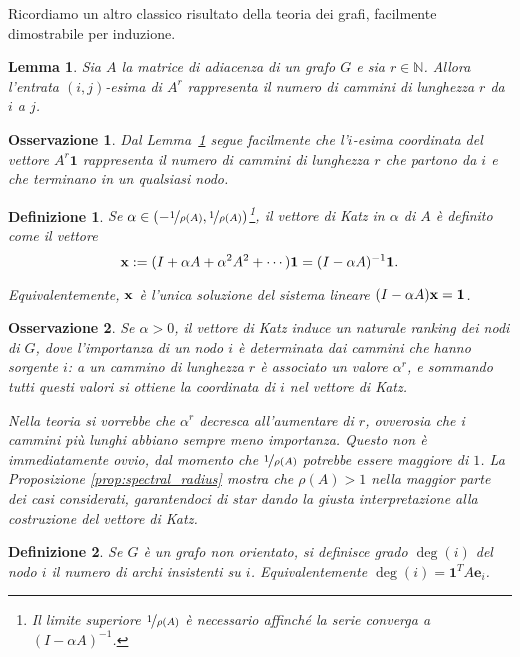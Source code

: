 \documentclass[a4paper]{article}
\newcommand{\NN}{\mathbb{N}}
\newcommand{\xvec}{{\bf x}}
\newcommand{\bone}{\mathbf{1}}
\newcommand{\inv}{^{-1}}
\newtheorem{lemma}{Lemma}
\newtheorem{definition}{Definizione}
\newtheorem{remark}{Osservazione}
\begin{document}
Ricordiamo un altro classico risultato della teoria dei grafi, facilmente
dimostrabile per induzione.

\begin{lemma}
    \label{lemma:numero_cammini}
    Sia $A$ la matrice di adiacenza di un grafo $G$ e sia $r \in \NN$. Allora l'entrata $(i,j)$-esima di $A^r$ rappresenta il numero di cammini
    di lunghezza $r$ da $i$ a $j$.
\end{lemma}

\begin{remark}
    \label{remark:molt_per_1}
    Dal Lemma~\ref{lemma:numero_cammini} segue facilmente che l'$i$-esima
    coordinata del vettore $A^r \bone$ rappresenta il numero di cammini
    di lunghezza $r$ che partono da $i$ e che terminano in un qualsiasi nodo.
\end{remark}

\begin{definition} Se $\alpha \in (-\nicefrac{1}{\rho(A)}, \nicefrac{1}{\rho(A)})$\footnote{Il limite superiore $\nicefrac{1}{\rho(A)}$ è necessario affinché la serie converga a $(I-\alpha A)\inv$.}, {\rm il vettore di Katz in $\alpha$ di $A$} è definito come il vettore
\[
    \xvec := (I + \alpha A + \alpha^2A^2+\cdots) \bone = (I-\alpha A)\inv \bone.
\]

Equivalentemente, $\xvec$ è l'unica soluzione del sistema lineare $(I-\alpha A)\xvec = \bone$.
\end{definition}

\begin{remark}
    Se $\alpha > 0$, il vettore di Katz induce un naturale ranking dei nodi di $G$, dove l'importanza
    di un nodo $i$ è determinata dai cammini che hanno sorgente $i$: a
    un cammino di lunghezza $r$ è associato un valore $\alpha^r$,
    e sommando tutti questi valori si ottiene la coordinata di $i$
    nel vettore di Katz.

    Nella teoria si vorrebbe che $\alpha^r$ decresca all'aumentare di $r$,
    ovverosia che i cammini più lunghi abbiano sempre meno importanza.
    Questo non è immediatamente ovvio, dal momento che $\nicefrac{1}{\rho(A)}$ potrebbe essere maggiore di $1$. La {\rm Proposizione
    \ref{prop:spectral_radius}} mostra che $\rho(A) > 1$ nella maggior
    parte dei casi considerati, garantendoci di star dando la giusta
    interpretazione alla costruzione del vettore di Katz.
\end{remark}

\begin{definition}
    Se $G$ è un grafo non orientato, si definisce {\rm grado} $\deg(i)$
    del nodo $i$ il numero di archi insistenti su $i$. Equivalentemente
    $\deg(i) = \bone^T A \mathbf{e}_i$.
\end{definition}
\end{document}

